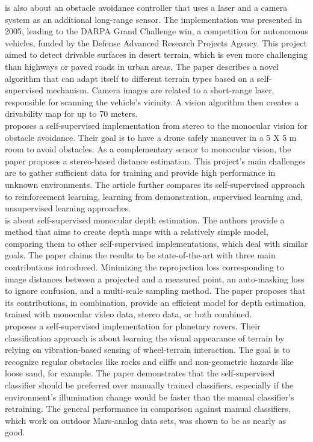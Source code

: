 \cite{Dahlkamp-RSS-06} is also about an obstacle avoidance controller that uses a laser and a camera system as an additional long-range sensor. The implementation was presented in 2005, leading to the DARPA Grand Challenge win, a competition for autonomous vehicles, funded by the Defense Advanced Research Projects Agency. This project aimed to detect drivable surfaces in desert terrain, which is even more challenging than highways or paved roads in urban areas. The paper describes a novel algorithm that can adapt itself to different terrain types based on a self-supervised mechanism. Camera images are related to a short-range laser, responsible for scanning the vehicle's vicinity. A vision algorithm then creates a drivability map for up to 70 meters.\\

\cite{hecke2016persistent} proposes a self-supervised implementation from stereo to the monocular vision for obstacle avoidance. Their goal is to have a drone safely maneuver in a 5 X 5 m room to avoid obstacles. As a complementary sensor to monocular vision, the paper proposes a stereo-based distance estimation. This project's main challenges are to gather sufficient data for training and provide high performance in unknown environments. The article further compares its self-supervised approach to reinforcement learning, learning from demonstration, supervised learning and, unsupervised learning approaches.\\

\cite{godard2018digging} is about self-supervised monocular depth estimation. The authors provide a method that aims to create depth maps with a relatively simple model, comparing them to other self-supervised implementations, which deal with similar goals. The paper claims the results to be state-of-the-art with three main contributions introduced. Minimizing the reprojection loss corresponding to image distances between a projected and a measured point, an auto-masking loss to ignore confusion, and a multi-scale sampling method. The paper proposes that its contributions, in combination, provide an efficient model for depth estimation, trained with monocular video data, stereo data, or both combined.\\

\cite{vibrationBasedLearning} proposes a self-supervised implementation for planetary rovers. Their classification approach is about learning the visual appearance of terrain by relying on vibration-based sensing of wheel-terrain interaction. The goal is to recognize regular obstacles like rocks and cliffs and non-geometric hazards like loose sand, for example. The paper demonstrates that the self-supervised classifier should be preferred over manually trained classifiers, especially if the environment's illumination change would be faster than the manual classifier's retraining. The general performance in comparison against manual classifiers, which work on outdoor Mars-analog data sets, was shown to be as nearly as good.\\

